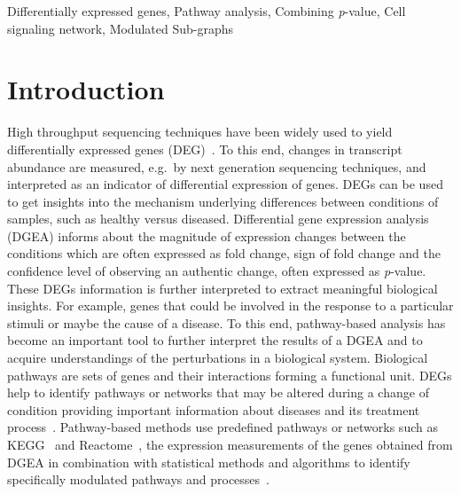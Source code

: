 \documentclass[10pt,a4paper,twocolumn]{article}
\begin{document}
Differentially expressed genes, Pathway analysis, Combining \textit{p}-value, Cell signaling network, Modulated Sub-graphs

\clearpage

\section*{Introduction}

High throughput sequencing techniques have been widely used to yield
differentially expressed genes (DEG)~\cite{DEG}. To this end, changes
in transcript abundance are measured, e.g.~by next generation
sequencing techniques, and interpreted as an indicator of differential
expression of genes. DEGs can be used to get insights into the
mechanism underlying differences between conditions of samples, such
as healthy versus diseased. Differential gene expression analysis
(DGEA) informs about the magnitude of expression changes between the
conditions which are often expressed as fold change, sign of fold
change and the confidence level of observing an authentic change,
often expressed as \textit{p}-value. These DEGs information is further
interpreted to extract meaningful biological insights. For example,
genes that could be involved in the response to a particular stimuli
or maybe the cause of a disease. To this end, pathway-based analysis
has become an important tool to further interpret the results of a
DGEA and to acquire understandings of the perturbations in a
biological system. Biological pathways are sets of genes and their
interactions forming a functional unit. DEGs help to identify pathways
or networks that may be altered during a change of condition providing
important information about diseases and its treatment
process~\cite{Khatri2012}. Pathway-based methods use predefined
pathways or networks such as KEGG~\cite{Kegg} and
Reactome~\cite{Reactome}, the expression measurements of the genes
obtained from DGEA in combination with statistical methods and
algorithms to identify specifically modulated pathways and
processes~\cite{Campos}.
\end{document}
